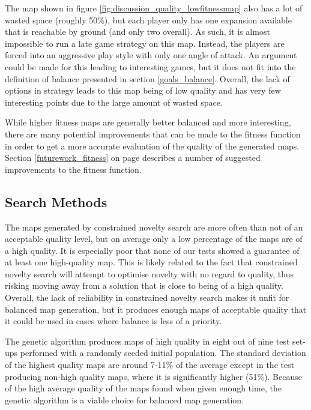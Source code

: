 
The map shown in figure \ref{fig:discussion_quality_lowfitnessmap} also has a lot of wasted space (roughly 50\%), but each player only has one expansion available that is reachable by ground (and only two overall). As such, it is almost impossible to run a late game strategy on this map. Instead, the players are forced into an aggressive play style with only one angle of attack. An argument could be made for this leading to interesting games, but it does not fit into the definition of balance presented in section \ref{goals_balance}. Overall, the lack of options in strategy leads to this map being of low quality and has very few interesting points due to the large amount of wasted space.


While higher fitness maps are generally better balanced and more interesting, there are many potential improvements that can be made to the fitness function in order to get a more accurate evaluation of the quality of the generated maps. Section \ref{futurework_fitness} on page \pageref{futurework_fitness} describes a number of suggested improvements to the fitness function.

\subsection{Search Methods}
\label{discussion_quality_searchmethods}
The maps generated by constrained novelty search are more often than not of an acceptable quality level, but on average only a low percentage of the maps are of a high quality. It is especially poor that none of our tests showed a guarantee of at least one high-quality map. This is likely related to the fact that constrained novelty search will attempt to optimise novelty with no regard to quality, thus risking moving away from a solution that is close to being of a high quality. Overall, the lack of reliability in constrained novelty search makes it unfit for balanced map generation, but it produces enough maps of acceptable quality that it could be used in cases where balance is less of a priority.

The genetic algorithm produces maps of high quality in eight out of nine test set-ups performed with a randomly seeded initial population. The standard deviation of the highest quality maps are around 7-11\% of the average except in the test producing non-high quality maps, where it is significantly higher (51\%). Because of the high average quality of the maps found when given enough time, the genetic algorithm is a viable choice for balanced map generation. 

